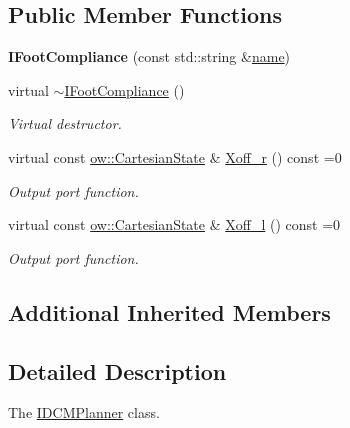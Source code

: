 \subsection*{Public Member Functions}
\begin{DoxyCompactItemize}
\item 
{\bfseries I\+Foot\+Compliance} (const std\+::string \&\hyperlink{classow_1_1GenericModuleBase_a4b712883728cdbab7779e27f9a23689c}{name})\hypertarget{classow_1_1IFootCompliance_a0efcdf2db32607892bf9c37fe570fbe8}{}\label{classow_1_1IFootCompliance_a0efcdf2db32607892bf9c37fe570fbe8}

\item 
virtual \hyperlink{classow_1_1IFootCompliance_acdc61f9d4ef6422181b23d0fe0538245}{$\sim$\+I\+Foot\+Compliance} ()\hypertarget{classow_1_1IFootCompliance_acdc61f9d4ef6422181b23d0fe0538245}{}\label{classow_1_1IFootCompliance_acdc61f9d4ef6422181b23d0fe0538245}

\begin{DoxyCompactList}\small\item\em Virtual destructor. \end{DoxyCompactList}\item 
virtual const \hyperlink{classow__core_1_1CartesianState}{ow\+::\+Cartesian\+State} \& \hyperlink{classow_1_1IFootCompliance_a15a6db7fdffa5be340ac746395f237ff}{Xoff\+\_\+r} () const =0
\begin{DoxyCompactList}\small\item\em Output port function. \end{DoxyCompactList}\item 
virtual const \hyperlink{classow__core_1_1CartesianState}{ow\+::\+Cartesian\+State} \& \hyperlink{classow_1_1IFootCompliance_a91d95a934cf1fb7f121007777eab5b62}{Xoff\+\_\+l} () const =0
\begin{DoxyCompactList}\small\item\em Output port function. \end{DoxyCompactList}\end{DoxyCompactItemize}
\subsection*{Additional Inherited Members}


\subsection{Detailed Description}
The \hyperlink{classow_1_1IDCMPlanner}{I\+D\+C\+M\+Planner} class. 

